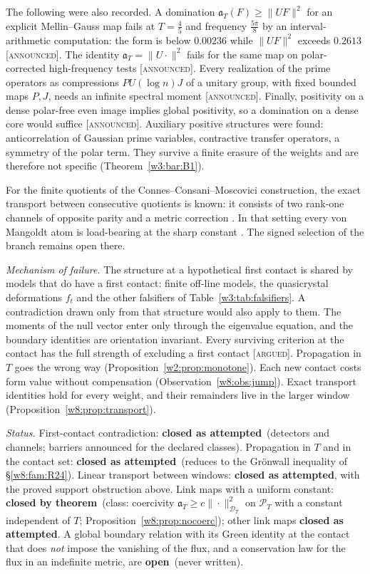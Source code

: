 \documentclass[11pt]{amsart}
\theoremstyle{definition}
\theoremstyle{remark}
\numberwithin{equation}{section}
\newcommand{\PT}{\mathcal{P}_T}                        %
\newcommand{\DT}{\mathcal{D}_T}                        %
\newcommand{\aT}{\mathfrak{a}_T}                       %
\newcommand{\stag}[1]{\textsc{[#1]}}
\newcommand{\ARGUED}{\stag{argued}}
\newcommand{\ANNOUNCED}{\stag{announced}}
\newcommand{\rtag}[1]{\textbf{\small\textsf{#1}}}
\newcommand{\closedT}{\rtag{closed by theorem}}
\newcommand{\closedA}{\rtag{closed as attempted}}
\newcommand{\openR}{\rtag{open}}
\newcommand{\entry}[1]{\par\smallskip\noindent\textit{#1.}\enspace}
\begin{document}
The following were also recorded. A domination $\aT(F)\ge\|UF\|^2$ for an explicit Mellin--Gauss map fails at
$T=\frac45$ and frequency $\frac{5\pi}8$ by an interval-arithmetic computation: the form is below $0.00236$ while
$\|UF\|^2$ exceeds $0.2613$ \ANNOUNCED. The identity $\aT=\|U\cdot\|^2$ fails for the same map on polar-corrected
high-frequency tests \ANNOUNCED. Every realization of the prime operators as compressions $PU(\log n)J$ of a unitary
group, with fixed bounded maps $P,J$, needs an infinite spectral moment \ANNOUNCED. Finally, positivity on a dense
polar-free even image implies global positivity, so a domination on a dense core would suffice \ANNOUNCED. Auxiliary
positive structures were found: anticorrelation of Gaussian prime variables, contractive transfer operators, a
symmetry of the polar term. They survive a finite erasure of the weights and are therefore not specific
(Theorem~\ref{w3:bar:B1}).

For the finite quotients of the Connes--Consani--Moscovici construction, the exact transport between consecutive
quotients is known: it consists of two rank-one channels of opposite parity and a metric correction
\cite[Theorem~4.1 and the theorem `Complete transport defect' of \S5]{P39}. In that setting every von Mangoldt atom is load-bearing at the sharp constant
\cite[Theorem~24.1]{P39}. The signed selection of the branch remains open there.

\entry{Mechanism of failure} The structure at a hypothetical first contact is shared by models that do have a first
contact: finite off-line models, the quasicrystal deformations $f_t$ and the other falsifiers of
Table~\ref{w3:tab:falsifiers}. A contradiction drawn only from that structure would also apply to them. The moments of
the null vector enter only through the eigenvalue equation, and the boundary identities are orientation invariant.
Every surviving criterion at the contact has the full strength of excluding a first contact \ARGUED. Propagation in
$T$ goes the wrong way (Proposition~\ref{w2:prop:monotone}). Each new contact costs form value without compensation
(Observation~\ref{w8:obs:jump}). Exact transport identities hold for every weight, and their remainders live in the
larger window (Proposition~\ref{w8:prop:transport}).

\entry{Status} First-contact contradiction: \closedA\ (detectors and channels; barriers announced for the declared
classes). Propagation in $T$ and in the contact set: \closedA\ (reduces to the Gr\"onwall inequality of
\S\ref{w8:fam:R24}). Linear transport between windows: \closedA, with the proved support obstruction above. Link maps
with a uniform constant: \closedT\ (class: coercivity $\aT\ge c\|\cdot\|_{\DT}^2$ on $\PT$ with a constant independent
of $T$; Proposition~\ref{w8:prop:nocoerc}); other link maps \closedA. A global boundary relation
with its Green identity at the contact that does \emph{not} impose the vanishing of the flux, and a conservation law
for the flux in an indefinite metric, are \openR\ (never written).
\end{document}
